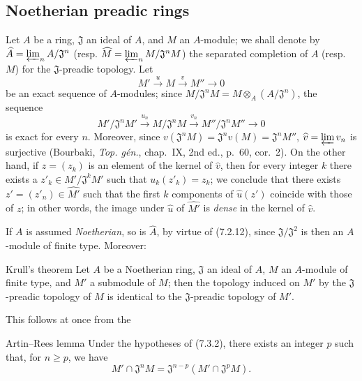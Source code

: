 \subsection{Noetherian preadic rings}
\label{subsection:0.7.3}

\begin{env}[7.3.1]
\label{0.7.3.1}
Let $A$ be a ring, $\mathfrak J$ an ideal of $A$, and $M$ an $A$-module;
we shall denote by
$\widehat A=\varprojlim_n A/\mathfrak J^n$ (resp.
$\widehat M=\varprojlim_n M/\mathfrak J^nM$) the separated completion of $A$
(resp. $M$) for the $\mathfrak J$-preadic topology. Let
\[
  M'\xrightarrow{u}M\xrightarrow{v}M''\to0
\]
be an exact sequence of $A$-modules; since
$M/\mathfrak J^nM=M\otimes_A(A/\mathfrak J^n)$, the sequence
\[
  M'/\mathfrak J^nM'\xrightarrow{u_n}
  M/\mathfrak J^nM\xrightarrow{v_n}
  M''/\mathfrak J^nM''\to0
\]
is exact for every $n$. Moreover, since
$v(\mathfrak J^nM)=\mathfrak J^nv(M)=\mathfrak J^nM''$,
$\widehat v=\varprojlim v_n$ is surjective (Bourbaki,
\emph{Top. gén.}, chap.~IX, 2nd ed., p.~60, cor.~2).
On the other hand, if $z=(z_k)$ is an element of the kernel of $\widehat v$, then for every
integer $k$ there exists a $z'_k\in M'/\mathfrak J^kM'$ such that
$u_k(z'_k)=z_k$; we conclude that there exists
$z'=(z'_n)\in\widehat{M'}$ such that the first $k$ components of
$\widehat u(z')$ coincide with those of $z$; in other words, the image under
$\widehat u$ of $\widehat{M'}$ is \emph{dense} in the kernel of
$\widehat v$.

If $A$ is assumed \emph{Noetherian}, so is $\widehat A$, by
virtue of (7.2.12), since $\mathfrak J/\mathfrak J^2$ is then an $A$-module of
finite type. Moreover:
\end{env}

\begin{namedtheorem}[7.3.2]{Krull's theorem}
\label{0.7.3.2}
Let $A$ be a Noetherian ring, $\mathfrak J$ an ideal of $A$, $M$ an
$A$-module of finite type, and $M'$ a submodule of $M$; then the topology
induced on $M'$ by the $\mathfrak J$-preadic topology of $M$ is identical
to the $\mathfrak J$-preadic topology of $M'$.
\end{namedtheorem}

This follows at once from the

\begin{namedlemma}[7.3.2.1]{Artin--Rees lemma}
\label{0.7.3.2.1}
Under the hypotheses of (7.3.2), there exists an integer $p$ such that, for
$n\geq p$, we have
\[
  M'\cap\mathfrak J^nM=\mathfrak J^{n-p}
  (M'\cap\mathfrak J^pM).
\]
\end{namedlemma}

